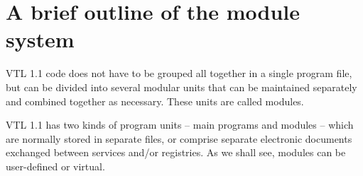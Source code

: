 \documentclass[droidmono,libertine,twoside,user,unofficial]{ecarticle}
\begin{document}




\section{A brief outline of the module system}
\label{sec:brief-intr-module}

VTL 1.1 code does not have to be grouped all together in a single
program file, but can be divided into several modular units that can
be maintained separately and combined together as necessary.  These
units are called modules.

VTL 1.1 has two kinds of program units -- main programs and modules --
which are normally stored in separate files, or comprise separate
electronic documents exchanged between services and/or registries.
%
As we shall see, modules can be user-defined or virtual.
\end{document}
